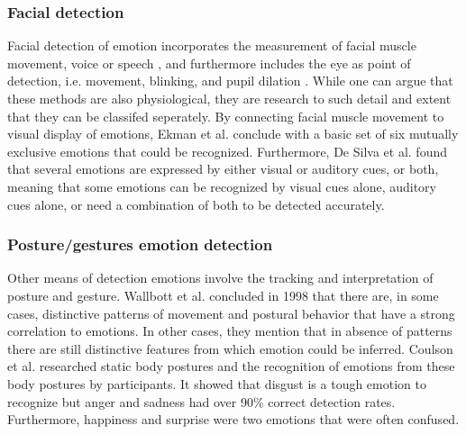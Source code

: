 \documentclass{sigchi}
\begin{document}
\subsubsection{Facial detection} %
\label{sub:facial_detection}
Facial detection of emotion incorporates the measurement of facial muscle movement, voice or speech \cite{Ververidis2004}, and furthermore includes the eye as point of detection, i.e. movement, blinking, and pupil dilation \cite{Soleymani2015}. While one can argue that these methods are also physiological, they are research to such detail and extent that they can be classifed seperately. By connecting facial muscle movement to visual display of emotions, Ekman et al. \cite{Ekman1969} conclude with a basic set of six mutually exclusive emotions that could be recognized. Furthermore, De Silva et al. \cite{Silva1997} found that several emotions are expressed by either visual or auditory cues, or both, meaning that some emotions can be recognized by visual cues alone, auditory cues alone, or need a combination of both to be detected accurately.

\subsubsection{Posture/gestures emotion detection}
Other means of detection emotions involve the tracking and interpretation of posture and gesture. Wallbott et al. \cite{Wallbott1998} concluded in 1998 that there are, in some cases, distinctive patterns of movement and postural behavior that have a strong correlation to emotions. In other cases, they mention that in absence of patterns there are still distinctive features from which emotion could be inferred. Coulson et al. \cite{Coulson2004} researched static body postures and the recognition of emotions from these body postures by participants. It showed that disgust is a tough emotion to recognize but anger and sadness had over 90\% correct detection rates. Furthermore, happiness and surprise were two emotions that were often confused. 
\end{document}
